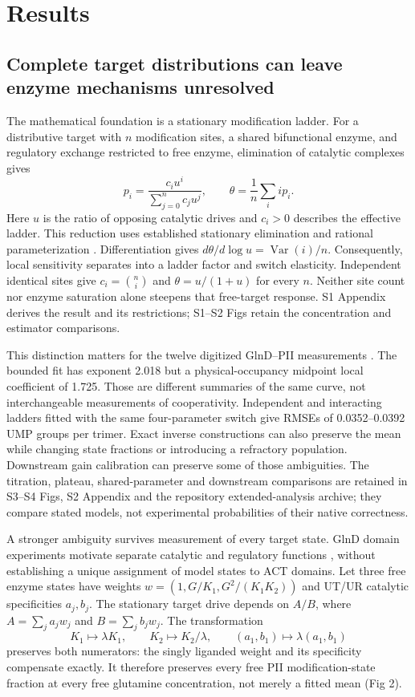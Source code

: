 \documentclass[10pt,letterpaper]{article}
\begin{document}
\section*{Results}

\subsection*{Complete target distributions can leave enzyme mechanisms unresolved}

The mathematical foundation is a stationary modification ladder. For a distributive target with $n$ modification sites, a shared bifunctional enzyme, and regulatory exchange restricted to free enzyme, elimination of catalytic complexes gives
\[
 p_i=\frac{c_i u^i}{\sum_{j=0}^{n}c_j u^j},\qquad
 \theta=\frac{1}{n}\sum_i i p_i.
\]
Here $u$ is the ratio of opposing catalytic drives and $c_i>0$ describes the effective ladder. This reduction uses established stationary elimination and rational parameterization \cite{r22,r23,r24,r25}. Differentiation gives $d\theta/d\log u=\operatorname{Var}(i)/n$. Consequently, local sensitivity separates into a ladder factor and switch elasticity. Independent identical sites give $c_i=\binom ni$ and $\theta=u/(1+u)$ for every $n$. Neither site count nor enzyme saturation alone steepens that free-target response. S1 Appendix derives the result and its restrictions; S1--S2 Figs retain the concentration and estimator comparisons.

This distinction matters for the twelve digitized GlnD--PII measurements \cite{r12}. The bounded fit has exponent 2.018 but a physical-occupancy midpoint local coefficient of 1.725. Those are different summaries of the same curve, not interchangeable measurements of cooperativity. Independent and interacting ladders fitted with the same four-parameter switch give RMSEs of 0.0352--0.0392 UMP groups per trimer. Exact inverse constructions can also preserve the mean while changing state fractions or introducing a refractory population. Downstream gain calibration can preserve some of those ambiguities. The titration, plateau, shared-parameter and downstream comparisons are retained in S3--S4 Figs, S2 Appendix and the repository extended-analysis archive; they compare stated models, not experimental probabilities of their native correctness.

A stronger ambiguity survives measurement of every target state. GlnD domain experiments motivate separate catalytic and regulatory functions \cite{r18,r17,r51}, without establishing a unique assignment of model states to ACT domains. Let three free enzyme states have weights $w=(1,G/K_1,G^2/(K_1K_2))$ and UT/UR catalytic specificities $a_j,b_j$. The stationary target drive depends on $A/B$, where $A=\sum_j a_jw_j$ and $B=\sum_j b_jw_j$. The transformation
\[
 K_1\mapsto\lambda K_1,\qquad K_2\mapsto K_2/\lambda,
 \qquad (a_1,b_1)\mapsto\lambda(a_1,b_1)
\]
preserves both numerators: the singly liganded weight and its specificity compensate exactly. It therefore preserves every free PII modification-state fraction at every free glutamine concentration, not merely a fitted mean (Fig 2).
\end{document}
